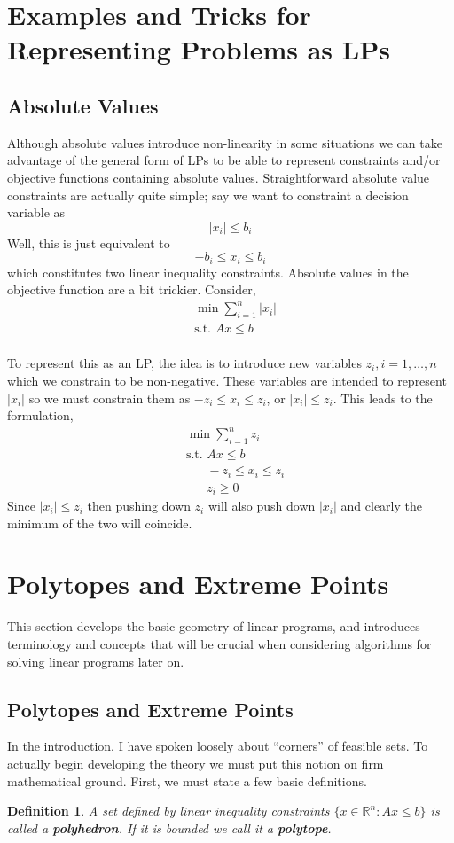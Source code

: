 \documentclass[12pt]{article}
\newcommand*{\abs}[1]{\left\lvert#1\right\rvert}
\newcommand{\R}{\mathcal{R}}
\def\R{\mathbb{R}}
\newtheorem{definition}{Definition}
\begin{document}
\section{Examples and Tricks for Representing Problems as LPs}

\subsection{Absolute Values}
Although absolute values introduce non-linearity in some situations we can take advantage of the general form of LPs to be able to represent constraints and/or objective functions
containing absolute values. Straightforward absolute value constraints are actually quite simple; say we want to constraint a decision variable as 
\[\abs{x_i} \leq b_i\]
Well, this is just equivalent to 
\[-b_i \leq x_i \leq b_i\]
which constitutes two linear inequality constraints. Absolute values in the objective function are a bit trickier. Consider, 
\begin{align*}
&\min \sum_{i = 1}^{n} \abs{x_i} \\
&\text{s.t. } Ax \leq b \\
\end{align*}

To represent this as an LP, the idea is to introduce new variables $z_i, i = 1, \dots, n$ which we constrain to be non-negative. These variables are intended to represent $\abs{x_i}$ so 
we must constrain them as $-z_i \leq x_i \leq z_i$, or $\abs{x_i} \leq z_i$. This leads to the formulation, 
\begin{align*}
&\min \sum_{i = 1}^{n} z_i \\
&\text{s.t. } Ax \leq b \\
&\;\;\;\;\;\; -z_i \leq x_i \leq z_i \\
&\;\;\;\;\;\; z_i \geq 0
\end{align*}
Since $\abs{x_i} \leq z_i$ then pushing down $z_i$ will also push down $\abs{x_i}$ and clearly the minimum of the two will coincide. 




\section{Polytopes and Extreme Points}
This section develops the basic geometry of linear programs, and introduces terminology and concepts that will be crucial when considering algorithms for solving linear programs
later on. 

\subsection{Polytopes and Extreme Points}
In the introduction, I have spoken loosely about ``corners'' of feasible sets. To actually begin developing the theory we must put this notion on firm mathematical ground. 
First, we must state a few basic definitions. 
\begin{definition}
A set defined by linear inequality constraints $\{x \in \R^n: Ax \leq b\}$ is called a \textbf{polyhedron}. If it is bounded we call it a \textbf{polytope}. 
\end{definition}
\end{document}
